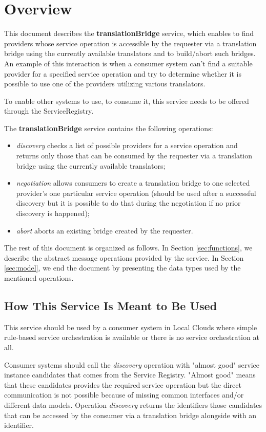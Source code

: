 \documentclass[a4paper]{arrowhead}
\begin{document}
\section{Overview}
\label{sec:overview}
This document describes the \textbf{translationBridge} service, which enables to find providers whose service operation is accessible by the requester via a translation bridge using the currently available translators and to build/abort such bridges. An example of this interaction is when a consumer system can't find a suitable provider for a specified service operation and try to determine whether it is possible to use one of the providers utilizing various translators.

To enable other systems to use, to consume it, this service needs to be offered through the ServiceRegistry.

The \textbf{translationBridge} service contains the following operations:

\begin{itemize}
    \item \textit{discovery} checks a list of possible providers for a service operation and returns only those that can be consumed by the requester via a translation bridge using the currently available translators;
    \item \textit{negotiation} allows consumers to create a translation bridge to one selected provider's one particular service operation (should be used after a successful discovery but it is possible to do that during the negotiation if no prior discovery is happened);
    \item \textit{abort} aborts an existing bridge created by the requester.
\end{itemize}

The rest of this document is organized as follows.
In Section \ref{sec:functions}, we describe the abstract message operations provided by the service.
In Section \ref{sec:model}, we end the document by presenting the data types used by the mentioned operations.

\subsection{How This Service Is Meant to Be Used}

This service should be used by a consumer system in Local Clouds where simple rule-based service orchestration is available or there is no service orchestration at all.

Consumer systems should call the \textit{discovery} operation with "almost good" service instance candidates that comes from the Service Registry. "Almost good" means that these candidates provides the required service operation but the direct communication is not possible because of missing common interfaces and/or different data models. Operation \textit{discovery} returns the identifiers those candidates that can be accessed by the consumer via a translation bridge alongside with an identifier.
\end{document}
